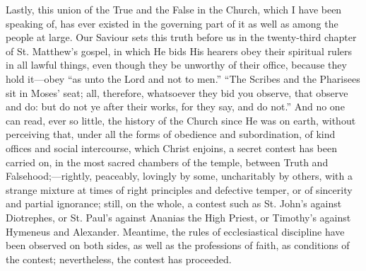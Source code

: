 Lastly, this union of the True and the False in the Church, which I
have been speaking of, has ever existed in the governing part of it as
well as among the people at large. Our Saviour sets this truth before
us in the twenty-third chapter of St. Matthew's gospel, in which He
bids His hearers obey their spiritual rulers in all lawful things,
even though they be unworthy of their office, because they hold it—obey
``as unto the Lord and not to men.'' ``The Scribes and the
Pharisees sit in Moses' seat; all, therefore, whatsoever they bid
you observe, that observe and do: but do not ye after their works, for
they say, and do not.'' And no one can read, ever so little, the
history of the Church since He was on earth, without perceiving that,
under all the forms of obedience and subordination, of kind offices
and social intercourse, which Christ enjoins, a secret contest has
been carried on, in the most sacred chambers of the temple, between
Truth and Falsehood;—rightly, peaceably, lovingly by some,
uncharitably by others, with a strange mixture at times of right
principles and defective temper, or of sincerity and partial
ignorance; still, on the whole, a contest such as St. John's against
Diotrephes, or St. Paul's against Ananias the High Priest, or
Timothy's against Hymeneus and Alexander. Meantime, the rules of
ecclesiastical discipline have been observed on both sides, as well as
the professions of faith, as conditions of the contest; nevertheless,
the contest has proceeded.

